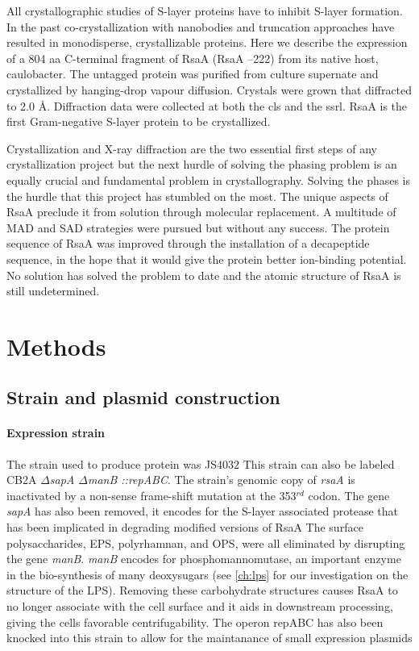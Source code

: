 All crystallographic studies of \ac{S-layer} proteins have to inhibit \ac{S-layer} formation. In the
past co-crystallization with nanobodies
 and truncation
 approaches have resulted in monodisperse, crystallizable proteins. Here we describe the
expression of a 804 \ac{aa} C-terminal fragment of RsaA (RsaA --222) from
its native host, \ac{caulobacter}. The untagged protein was purified
from culture supernate and crystallized by hanging-drop vapour
diffusion. Crystals were grown that diffracted to 2.0 \AA.
Diffraction data were collected at both the \ac{cls} 
and the \ac{ssrl}. RsaA is the first Gram-negative \ac{S-layer} protein to be crystallized.

Crystallization and X-ray diffraction are the two essential first steps of any crystallization project but the next hurdle of solving the phasing problem is an equally crucial and fundamental problem in crystallography. Solving the phases is the hurdle that this project has stumbled on the most. The unique aspects of RsaA preclude it from solution through molecular replacement. A multitude of \ac{MAD} and \ac{SAD} strategies were pursued but without any success. The protein sequence of RsaA was improved through the installation of a decapeptide sequence, in the hope that it would give the protein better ion-binding potential. No solution has solved the problem to date and the atomic structure of RsaA is still undetermined.

\section{Methods}
\label{sec:crystal-materials-and-methods}

\subsection{Strain and plasmid construction}\label{sec:stra-plasm-constr}

\paragraph{Expression strain} The strain used to produce protein was JS4032 
This strain can also be labeled \caulobacter{} CB2A \textit{$\Delta$sapA $\Delta$manB ::repABC}. The strain's genomic copy of \textit{rsaA} is inactivated by a non-sense frame-shift mutation at the 353$^{rd}$ codon. The gene \textit{sapA} has also been removed, it encodes for the S-layer associated protease that has been implicated in degrading modified versions of RsaA The surface polysaccharides, \ac{EPS}, polyrhamnan, and \ac{OPS}, were all eliminated by disrupting the gene \textit{manB}. \textit{manB} encodes for phosphomannomutase, an important enzyme in the bio-synthesis of many deoxysugars (see \cref{ch:lps} for our investigation on the structure of the \ac{LPS}). Removing these carbohydrate structures causes RsaA to no longer associate with the cell surface and it aids in downstream processing, giving the cells favorable centrifugability. The operon repABC has also been knocked into this strain to allow for the maintanance of small expression plasmids

